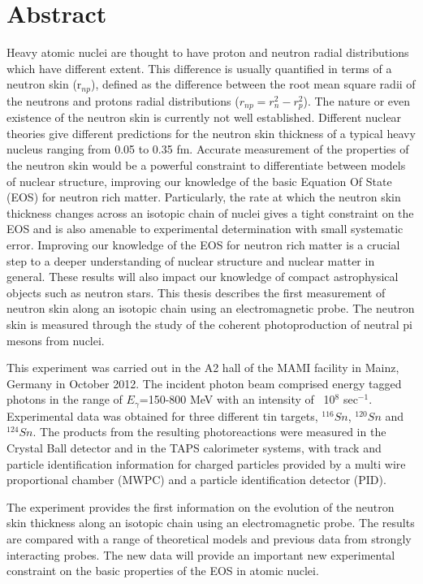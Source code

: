 \chapter*{Abstract}
\noindent

\indent Heavy atomic nuclei are thought to have proton and neutron radial distributions which have different extent. This difference is usually quantified in terms of a neutron skin (r$_{np}$), defined as the difference between the root mean square radii of the neutrons and protons radial distributions ($r_{np} = r_{n}^{2} - r_{p}^{2}$). The nature or even existence of the neutron skin is currently not well established. Different nuclear theories give different predictions for the neutron skin thickness of a typical heavy nucleus ranging from 0.05 to 0.35 fm. Accurate measurement of the properties of the neutron skin would be a powerful constraint to differentiate between models of nuclear structure, improving our knowledge of the basic Equation Of State (EOS) for neutron rich matter. Particularly, the rate at which the neutron skin thickness changes across an isotopic chain of nuclei gives a tight constraint on the EOS and is also amenable to experimental determination with small systematic error. Improving our knowledge of the EOS for neutron rich matter is a crucial step to a deeper understanding of nuclear structure and nuclear matter in general. These results will also impact our knowledge of compact astrophysical objects such as neutron stars. This thesis describes the first measurement of neutron skin  along an isotopic chain using an electromagnetic probe. The neutron skin is measured through the study of the coherent photoproduction of neutral pi mesons from nuclei. 

\indent This experiment was carried out in the A2 hall of the MAMI facility in Mainz, Germany in October 2012.  The incident photon beam comprised energy tagged photons in the range of $E_{\gamma}$=150-800 MeV with an intensity of ~10$^{8}$ sec$^{-1}$. Experimental data was obtained for three different tin targets, $^{116}Sn$, $^{120}Sn$ and $^{124}Sn$. The products from the resulting photoreactions were measured in the Crystal Ball detector and in the TAPS calorimeter systems, with track and particle identification information for charged particles provided by a multi wire proportional chamber (MWPC) and a particle identification detector (PID).

\indent The experiment provides the first information on the evolution of the neutron skin thickness along an isotopic chain using an electromagnetic probe. The results are compared with a range of theoretical models and previous data from strongly interacting probes. The new data will provide an important new experimental constraint on the basic properties of the EOS in atomic nuclei.

\indent

\vspace{10mm}
\normalsize
